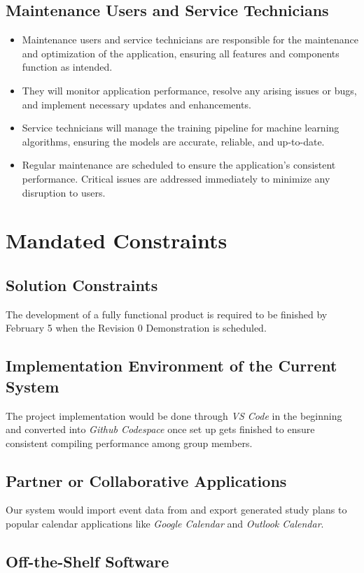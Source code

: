 \documentclass[12pt]{article}
\begin{document}
\subsection{Maintenance Users and Service Technicians}
\begin{itemize}
    \item Maintenance users and service technicians are responsible for the maintenance and optimization of the application, ensuring all features and components function as intended.
    \item They will monitor application performance, resolve any arising issues or bugs, and implement necessary updates and enhancements.
    \item Service technicians will manage the training pipeline for machine learning algorithms, ensuring the models are accurate, reliable, and up-to-date.
    \item Regular maintenance are scheduled to ensure the application's consistent performance. Critical issues are addressed immediately to minimize any disruption to users.
\end{itemize}


\section{Mandated Constraints}
\subsection{Solution Constraints}
The development of a fully functional product is required to be finished by February 5 when the Revision 0 Demonstration is scheduled.
\subsection{Implementation Environment of the Current System}
The project implementation would be done through \textit{VS Code} in the beginning and converted into \textit{Github Codespace} once set up gets finished to ensure consistent compiling performance among group members.
\subsection{Partner or Collaborative Applications}
Our system would import event data from and export generated study plans to popular calendar applications like \textit{Google Calendar} and \textit{Outlook Calendar}. 
\subsection{Off-the-Shelf Software}
\end{document}
